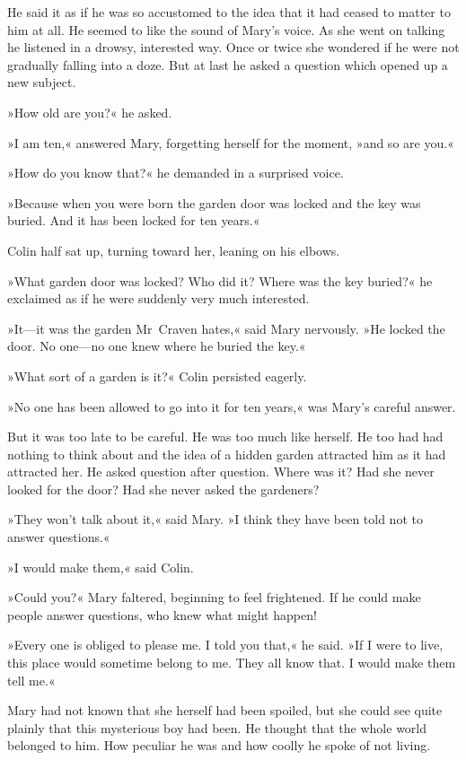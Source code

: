 He said it as if he was so accustomed to the idea that it had ceased to matter to him at all. He seemed to like the sound of Mary's voice. As she went on talking he listened in a drowsy, interested way. Once or twice she wondered if he were not gradually falling into a doze. But at last he asked a question which opened up a new subject.

»How old are you?« he asked.

»I am ten,« answered Mary, forgetting herself for the moment, »and so are you.«

»How do you know that?« he demanded in a surprised voice.

»Because when you were born the garden door was locked and the key was buried. And it has been locked for ten years.«

Colin half sat up, turning toward her, leaning on his elbows.

»What garden door was locked? Who did it? Where was the key buried?« he exclaimed as if he were suddenly very much interested.

»It—it was the garden Mr~Craven hates,« said Mary nervously. »He locked the door. No one—no one knew where he buried the key.«

»What sort of a garden is it?« Colin persisted eagerly.

»No one has been allowed to go into it for ten years,« was Mary's careful answer.

But it was too late to be careful. He was too much like herself. He too had had nothing to think about and the idea of a hidden garden attracted him as it had attracted her. He asked question after question. Where was it? Had she never looked for the door? Had she never asked the gardeners?

»They won't talk about it,« said Mary. »I think they have been told not to answer questions.«

»I would make them,« said Colin.

»Could you?« Mary faltered, beginning to feel frightened. If he could make people answer questions, who knew what might happen!

»Every one is obliged to please me. I told you that,« he said. »If I were to live, this place would sometime belong to me. They all know that. I would make them tell me.«

Mary had not known that she herself had been spoiled, but she could see quite plainly that this mysterious boy had been. He thought that the whole world belonged to him. How peculiar he was and how coolly he spoke of not living.

